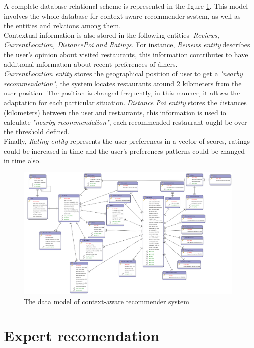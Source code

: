 A complete database relational scheme is represented in the figure
\ref{fig:datamodel}. This model involves the whole database for
context-aware recommender system, as well as the entities and
relations among them. \\Contextual information is also stored in the following
entities:
\textit{Reviews, CurrentLocation, DistancePoi and Ratings.} For
instance, \textit{Reviews entity} describes the user’s opinion about
visited restaurants, this information contributes to have additional
information about recent preferences of diners.\\   
\textit{CurrentLocation entity} stores the geographical position of
user to get a \textit{"nearby recommendation"}, the system locates
restaurants around 2 kilometers from the user position. The position
is changed frequently, in this manner, it allows the adaptation for
each particular situation. \textit{Distance Poi entity} stores the
distances (kilometers) between the user and restaurants, this
information is used to calculate \textit{"nearby recommendation"}, 
each recommended restaurant ought be over the threshold defined.\\   
Finally, \textit{Rating entity} represents the user preferences 
in a vector of scores, ratings could be increased in time and 
the user's preferences patterns could be changed in time also.
\begin{landscape} 
\begin{figure}[!h] 
\captionsetup{font=footnotesize}
\centering
\includegraphics[width=1.3\textwidth]{img/recomet.png}
\caption{The data model of context-aware recommender system.}
\label{fig:datamodel}    
\end{figure}
\end{landscape}

\section{Expert recomendation} 

